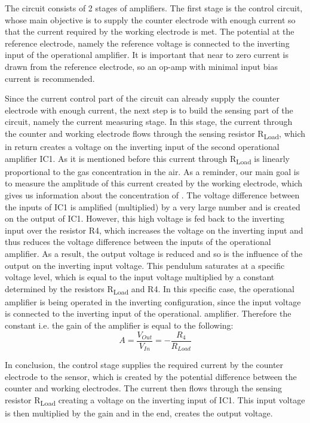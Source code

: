 The circuit consists of 2 stages of amplifiers. The first stage is the control circuit, whose main objective is to supply the counter electrode with enough current so that the current required by the working electrode is met. The potential at the reference electrode, namely the reference voltage is connected to the inverting input of the operational amplifier. It is important that near to zero current is drawn from the reference electrode, so an op-amp with minimal input bias current is recommended.\cite{2009} \par 
Since the current control part of the circuit can already supply the counter electrode with enough current, the next step is to build the sensing part of the circuit, namely the current measuring stage. In this stage, the current through the counter and working electrode flows through the sensing resistor R\textsubscript{Load}, which in return creates a voltage on the inverting input of the second operational amplifier IC1. As it is mentioned before this current through R\textsubscript{Load} is linearly proportional to the gas concentration in the air. As a reminder, our main goal is to measure the amplitude of this current created by the working electrode, which gives us information about the concentration of . The voltage difference between the inputs of IC1 is amplified (multiplied) by a very large number and is created on the output of IC1. However, this high voltage is fed back to the inverting input over the resistor R4, which increases the voltage on the inverting input and thus reduces the voltage difference between the inputs of the operational amplifier. As a result, the output voltage is reduced and so is the influence of the output on the inverting input voltage. This pendulum saturates at a specific voltage level, which is equal to the input voltage multiplied by a constant determined by the resistors R\textsubscript{Load} and R4. In this specific case, the operational amplifier is being operated in the inverting configuration, since the input voltage is connected to the inverting input of the operational. amplifier. Therefore the constant i.e. the gain of the amplifier is equal to the following: \[A = \frac{V_{Out}}{V_{In}} = -\frac{R_4}{R_{Load}} \] \par
In conclusion, the control stage supplies the required current by the counter electrode to the sensor, which is created by the potential difference between the counter and working electrodes. The current then flows through the sensing resistor  R\textsubscript{Load} creating a voltage on the inverting input of IC1. This input voltage is then multiplied by the gain and in the end, creates the output voltage.


